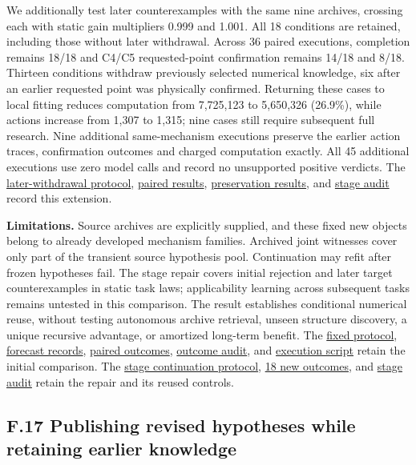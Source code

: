 \documentclass[twoside,11pt]{article}
\begin{document}
We additionally test later counterexamples with the same nine archives, crossing each with static gain multipliers 0.999 and 1.001. All 18 conditions are retained, including those without later withdrawal. Across 36 paired executions, completion remains 18/18 and C4/C5 requested-point confirmation remains 14/18 and 8/18. Thirteen conditions withdraw previously selected numerical knowledge, six after an earlier requested point was physically confirmed. Returning these cases to local fitting reduces computation from 7,725,123 to 5,650,326 (26.9\%), while actions increase from 1,307 to 1,315; nine cases still require subsequent full research. Nine additional same-mechanism executions preserve the earlier action traces, confirmation outcomes and charged computation exactly. All 45 additional executions use zero model calls and record no unsupported positive verdicts. The \hyperlink{artifact-136}{later-withdrawal protocol}, \hyperlink{artifact-137}{paired results}, \hyperlink{artifact-138}{preservation results}, and \hyperlink{artifact-139}{stage audit} record this extension.


\textbf{Limitations.} Source archives are explicitly supplied, and these fixed new objects belong to already developed mechanism families. Archived joint witnesses cover only part of the transient source hypothesis pool. Continuation may refit after frozen hypotheses fail. The stage repair covers initial rejection and later target counterexamples in static task laws; applicability learning across subsequent tasks remains untested in this comparison. The result establishes conditional numerical reuse, without testing autonomous archive retrieval, unseen structure discovery, a unique recursive advantage, or amortized long-term benefit. The \hyperlink{artifact-140}{fixed protocol}, \hyperlink{artifact-141}{forecast records}, \hyperlink{artifact-142}{paired outcomes}, \hyperlink{artifact-143}{outcome audit}, and \hyperlink{artifact-144}{execution script} retain the initial comparison. The \hyperlink{artifact-145}{stage continuation protocol}, \hyperlink{artifact-146}{18 new outcomes}, and \hyperlink{artifact-147}{stage audit} retain the repair and its reused controls.


\subsection*{F.17 Publishing revised hypotheses while retaining earlier knowledge}
\end{document}

